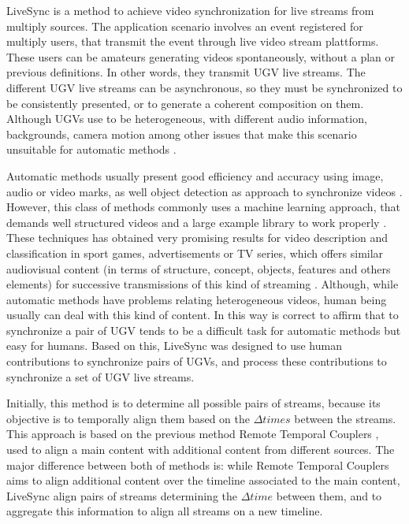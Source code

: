
LiveSync is a method to achieve video synchronization for live streams from multiply sources. The application scenario involves an event registered for multiply users, that transmit the event through live video stream plattforms. These users can be amateurs generating videos spontaneously, without a plan or previous definitions. In other words, they transmit UGV live streams. The different UGV live streams can be asynchronous, so they must be synchronized to be consistently presented, or to generate a coherent composition on them. Although UGVs use to be heterogeneous, with different audio information, backgrounds, camera motion among other issues that make this scenario unsuitable for automatic methods \cite{schweiger2013fully}.

Automatic methods usually present good efficiency and accuracy using image, audio or video marks, as well object detection as approach to synchronize videos \cite{key:article}. However, this class of methods commonly uses a machine learning approach, that demands well structured videos and a large example library to work properly \cite{KarpathyCVPR14}. These techniques has obtained very promising results for video description and classification in sport games, advertisements or TV series, which offers similar audiovisual content (in terms of structure, concept, objects, features and others elements) for successive transmissions of this kind of streaming \cite{6909619}. Although, while automatic methods have problems relating heterogeneous videos,  human being usually can deal with this kind of content. In this way is correct to affirm that to synchronize a pair of UGV tends to be a difficult task for automatic methods but easy for humans. Based on this, LiveSync was designed to use human contributions to synchronize pairs of UGVs, and process these contributions to synchronize a set of UGV live streams.

Initially, this method is to determine all possible pairs of streams, because its objective is to temporally align them based on the $\Delta{times}$ between the streams. This approach is based on the previous method Remote Temporal Couplers \cite{segundo2015remote}, used to align a main content with additional content from different sources. The major difference between both of methods is: while Remote Temporal Couplers aims to align additional content over the timeline associated to the main content, LiveSync align pairs of streams determining the $\Delta{time}$ between them, and to aggregate this information to align all streams on a new timeline.

